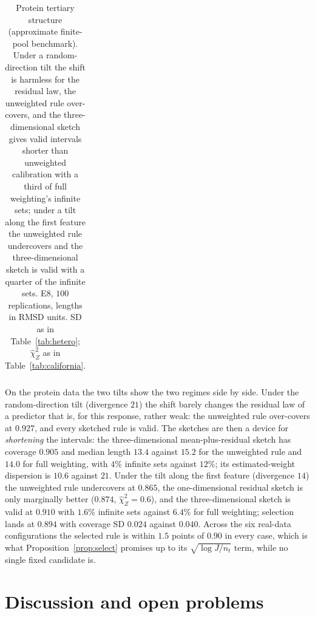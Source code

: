 \documentclass[11pt,a4paper]{article}
\theoremstyle{plain}
\theoremstyle{definition}
\theoremstyle{remark}
\begin{document}
\begin{table}[!htbp]
\begin{tabular}{lcccc}
\bottomrule
\end{tabular}
\caption{Protein tertiary structure (approximate finite-pool benchmark). Under a random-direction tilt the shift is harmless for the residual law, the unweighted rule over-covers, and the three-dimensional sketch gives valid intervals shorter than unweighted calibration with a third of full weighting's infinite sets; under a tilt along the first feature the unweighted rule undercovers and the three-dimensional sketch is valid with a quarter of the infinite sets. E8, $100$ replications, lengths in RMSD units. SD as in Table~\ref{tab:hetero}; $\hat\chi^2_Z$ as in Table~\ref{tab:california}.}\label{tab:protein}
\end{table}

On the protein data the two tilts show the two regimes side by side. Under the random-direction tilt (divergence $21$) the shift barely changes the residual law of a predictor that is, for this response, rather weak: the unweighted rule over-covers at $0.927$, and every sketched rule is valid. The sketches are then a device for \emph{shortening} the intervals: the three-dimensional mean-plus-residual sketch has coverage $0.905$ and median length $13.4$ against $15.2$ for the unweighted rule and $14.0$ for full weighting, with $4\%$ infinite sets against $12\%$; its estimated-weight dispersion is $10.6$ against $21$. Under the tilt along the first feature (divergence $14$) the unweighted rule undercovers at $0.865$, the one-dimensional residual sketch is only marginally better ($0.874$, $\hat\chi^2_Z=0.6$), and the three-dimensional sketch is valid at $0.910$ with $1.6\%$ infinite sets against $6.4\%$ for full weighting; selection lands at $0.894$ with coverage SD $0.024$ against $0.040$. Across the six real-data configurations the selected rule is within $1.5$ points of $0.90$ in every case, which is what Proposition~\ref{prop:select} promises up to its $\sqrt{\log J/n_t}$ term, while no single fixed candidate is.

\FloatBarrier

\section{Discussion and open problems}\label{sec:disc}
\end{document}
